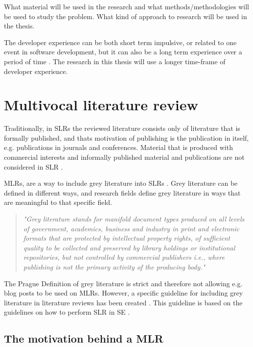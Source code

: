 \documentclass[english, 12pt, a4paper, sci, utf8, a-1b, online]{aaltothesis}
\begin{document}
What material will be used in the research and what methods/methodologies will be used to study the problem. What kind of approach to research will be used in the thesis.

The developer experience can be both short term impulsive, or related to one event in software development, but it can also be a long term experience over a period of time \cite{fagerholm-doctoral-thesis}. The research in this thesis will use a longer time-frame of developer experience.

\clearpage
\section{Multivocal literature review}

Traditionally, in SLRs the reviewed literature consists only of literature that is formally published, and thats motivation of publishing is the publication in itself, e.g. publications in journals and conferences. Material that is produced with commercial interests and informally published material and publications are not considered in SLR \cite{guidelines-for-MLR}.

MLRs, are a way to include grey literature into SLRs \cite{the-need-for-MLR}. Grey literature can be defined in different ways, and research fields define grey literature in ways that are meaningful to that specific field.

\begin{quotation}
  \textit{"Grey literature stands for manifold document types produced on all levels of government, academics, business and industry in print and electronic formats that are protected by intellectual property rights, of sufficient quality to be collected and preserved by library holdings or institutional repositories, but not controlled by commercial publishers i.e., where publishing is not the primary activity of the producing body."} \cite{towards-a-prague-definition-of-grey-literature}
\end{quotation}

The Prague Definition of grey literature is strict and therefore not allowing e.g. blog posts to be used on MLRs. However, a specific guideline for including grey literature in literature reviews has been created \cite{guidelines-for-MLR}. This guideline is based on the guidelines on how to perform SLR in SE \cite{guidelines-for-SLR-in-SE}.


\subsection{The motivation behind a MLR}
\end{document}
